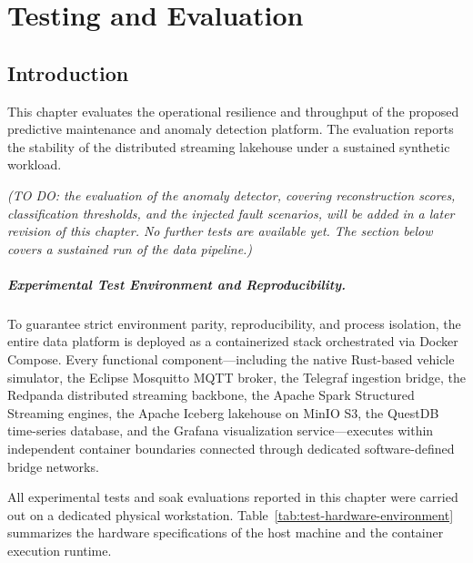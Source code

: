 \chapter{Testing and Evaluation}
\label{chap:testing_evaluation}

\section{Introduction}

This chapter evaluates the operational resilience and throughput of the proposed predictive maintenance and anomaly detection platform. The evaluation reports the stability of the distributed streaming lakehouse under a sustained synthetic workload.

\textit{(TO DO: the evaluation of the anomaly detector, covering reconstruction scores, classification thresholds, and the injected fault scenarios, will be added in a later revision of this chapter. No further tests are available yet. The section below covers a sustained run of the data pipeline.)}

\paragraph{Experimental Test Environment and Reproducibility.}
To guarantee strict environment parity, reproducibility, and process isolation, the entire data platform is deployed as a containerized stack orchestrated via Docker Compose. Every functional component---including the native Rust-based vehicle simulator, the Eclipse Mosquitto MQTT broker, the Telegraf ingestion bridge, the Redpanda distributed streaming backbone, the Apache Spark Structured Streaming engines, the Apache Iceberg lakehouse on MinIO S3, the QuestDB time-series database, and the Grafana visualization service---executes within independent container boundaries connected through dedicated software-defined bridge networks.

All experimental tests and soak evaluations reported in this chapter were carried out on a dedicated physical workstation. Table~\ref{tab:test-hardware-environment} summarizes the hardware specifications of the host machine and the container execution runtime.

